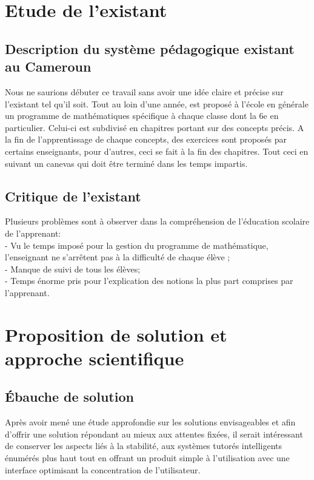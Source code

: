 \section{Etude de l’existant}

\subsection{Description du système pédagogique existant au Cameroun }
	Nous ne saurions débuter ce travail sans avoir une idée claire et précise sur l’existant tel qu’il soit. Tout au loin d’une année, est proposé à l’école en générale un programme de mathématiques spécifique à chaque classe dont la 6e en particulier. Celui-ci est subdivisé en chapitres portant sur des concepts précis. A la fin de l’apprentissage de chaque concepts, des exercices sont proposés par certains enseignants, pour d’autres, ceci se fait à la fin des chapitres. Tout ceci en suivant un canevas qui doit être terminé dans les temps impartis. 

\subsection{Critique de l’existant}
Plusieurs problèmes sont à observer dans la compréhension de l’éducation  scolaire de l’apprenant: \\
	- Vu le temps imposé pour la gestion du programme de mathématique, l’enseignant ne s'arrêtent pas à la difficulté de chaque élève ; \\
	- Manque de suivi de tous les élèves;\\
	- Temps énorme pris pour l’explication des notions la plus part comprises par l’apprenant.


%	
%
\section{Proposition de solution et approche scientifique }

\subsection{Ébauche de solution }
	Après avoir mené une étude approfondie sur les solutions envisageables et afin d’offrir une solution répondant au mieux aux attentes fixées, il serait intéressant de conserver les aspects liés à la stabilité, aux systèmes tutorés intelligents énumérés plus haut tout en offrant un produit simple à l’utilisation avec une interface optimisant la concentration de l’utilisateur.
	
